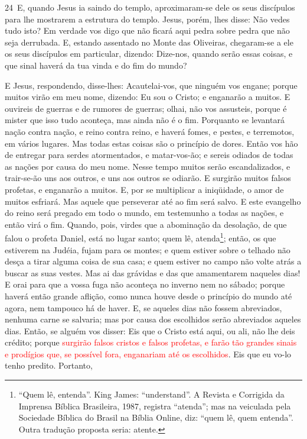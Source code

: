\medskip

\lettrine{24}\ E, quando Jesus ia saindo do templo,
aproximaram-se dele os seus discípulos para lhe mostrarem a
estrutura do templo. Jesus, porém, lhes disse: Não vedes tudo
isto? Em verdade vos digo que não ficará aqui pedra sobre pedra que
não seja derrubada. E, estando assentado no Monte das Oliveiras,
chegaram-se a ele os seus discípulos em particular, dizendo:
Dize-nos, quando serão essas coisas, e que sinal haverá da tua vinda
e do fim do mundo?

E Jesus, respondendo, disse-lhes: Acautelai-vos, que ninguém vos
engane; porque muitos virão em meu nome, dizendo: Eu sou o
Cristo; e enganarão a muitos. E ouvireis de guerras e de rumores
de guerras; olhai, não vos assusteis, porque é mister que isso tudo
aconteça, mas ainda não é o fim. Porquanto se levantará nação
contra nação, e reino contra reino, e haverá fomes, e pestes, e
terremotos, em vários lugares. Mas todas estas coisas são o
princípio de dores. Então vos hão de entregar para serdes
atormentados, e matar-vos-ão; e sereis odiados de todas as nações
por causa do meu nome. Nesse tempo muitos serão
escandalizados, e trair-se-ão uns aos outros, e uns aos outros se
odiarão. E surgirão muitos falsos profetas, e enganarão a
muitos. E, por se multiplicar a iniqüidade, o amor de muitos
esfriará. Mas aquele que perseverar até ao fim será salvo.
E este evangelho do reino será pregado em todo o mundo, em
testemunho a todas as nações, e então virá o fim. Quando,
pois, virdes que a abominação da desolação, de que falou o profeta
Daniel, está no lugar santo; quem lê, atenda\footnote{``Quem lê,
entenda''. King James: ``understand''. A Revista e Corrigida da
Imprensa Bíblica Brasileira, 1987, registra ``atenda''; mas na
veiculada pela Sociedade Bíblica do Brasil na Bíblia Online, diz:
``quem lê, quem entenda''. Outra tradução proposta seria: atente.};
então, os que estiverem na Judéia, fujam para os montes;
e quem estiver sobre o telhado não desça a tirar alguma coisa
de sua casa; e quem estiver no campo não volte atrás a buscar
as suas vestes. Mas ai das grávidas e das que amamentarem
naqueles dias! E orai para que a vossa fuga não aconteça no
inverno nem no sábado; porque haverá então grande aflição,
como nunca houve desde o princípio do mundo até agora, nem tampouco
há de haver. E, se aqueles dias não fossem abreviados,
nenhuma carne se salvaria; mas por causa dos escolhidos serão
abreviados aqueles dias. Então, se alguém vos disser: Eis que
o Cristo está aqui, ou ali, não lhe deis crédito; porque
\textcolor{red}{surgirão falsos cristos e falsos profetas, e farão tão
grandes sinais e prodígios que, se possível fora, enganariam até os
escolhidos}. Eis que eu vo-lo tenho predito. Portanto,
